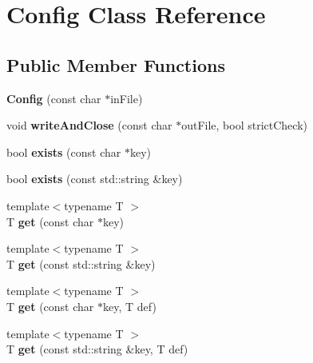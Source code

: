 \hypertarget{classConfig}{\section{Config Class Reference}
\label{classConfig}
}
\subsection*{Public Member Functions}
\begin{DoxyCompactItemize}
\item 
\hypertarget{classConfig_a17ddbd4edf9e5f8e130bb85370f0d8b7}{{\bfseries Config} (const char $\ast$in\-File)}\label{classConfig_a17ddbd4edf9e5f8e130bb85370f0d8b7}

\item 
\hypertarget{classConfig_a541a794277a0f2ad86fb965ccd27a2ae}{void {\bfseries write\-And\-Close} (const char $\ast$out\-File, bool strict\-Check)}\label{classConfig_a541a794277a0f2ad86fb965ccd27a2ae}

\item 
\hypertarget{classConfig_ac5e2bc2c541d36f5441c84bf25649ef6}{bool {\bfseries exists} (const char $\ast$key)}\label{classConfig_ac5e2bc2c541d36f5441c84bf25649ef6}

\item 
\hypertarget{classConfig_a6d0453bf1e96d0390521efbb0e904523}{bool {\bfseries exists} (const std\-::string \&key)}\label{classConfig_a6d0453bf1e96d0390521efbb0e904523}

\item 
\hypertarget{classConfig_a52e4ff571be6515ecea0f1b14794087f}{{\footnotesize template$<$typename T $>$ }\\T {\bfseries get} (const char $\ast$key)}\label{classConfig_a52e4ff571be6515ecea0f1b14794087f}

\item 
\hypertarget{classConfig_aaa2d3de617583fbbc65b4bbc1778ed94}{{\footnotesize template$<$typename T $>$ }\\T {\bfseries get} (const std\-::string \&key)}\label{classConfig_aaa2d3de617583fbbc65b4bbc1778ed94}

\item 
\hypertarget{classConfig_a6034829eb5be47b7b9d6a3d90f3a4f67}{{\footnotesize template$<$typename T $>$ }\\T {\bfseries get} (const char $\ast$key, T def)}\label{classConfig_a6034829eb5be47b7b9d6a3d90f3a4f67}

\item 
\hypertarget{classConfig_a1389961bf83660636d1a09c0d3fcd12a}{{\footnotesize template$<$typename T $>$ }\\T {\bfseries get} (const std\-::string \&key, T def)}\label{classConfig_a1389961bf83660636d1a09c0d3fcd12a}


\end{DoxyCompactItemize}

